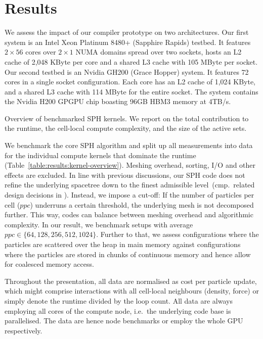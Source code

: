 \section{Results}
\label{section:results}

We assess the impact of our compiler prototype on two architectures.
Our first system is an Intel Xeon Platinum 8480+ (Sapphire Rapids) testbed. 
It features $2 \times 56$ cores over $2 \times 1$ NUMA domains spread over
two sockets, hosts
an L2 cache of 2,048 KByte per core and a shared L3 cache with 105 MByte per
socket.
Our second testbed is an Nvidia GH200 (Grace Hopper) system.
It features 72 cores in a single socket configuration.
Each core has an L2 cache of 1,024 KByte, and a shared L3 cache with 114 MByte for the entire
socket. The system contains the Nvidia H200 GPGPU chip boasting 96GB HBM3 memory at 4TB/s.

\begin{table}[htb]
  \caption{
    Overview of benchmarked SPH kernels. We report on the total contribution to the runtime, the cell-local compute complexity, and the size of the active sets.
    \label{table:results:kernel-overview}
  }
  \begin{center}
    
  \end{center}
\end{table}


We benchmark the core SPH algorithm and split up all measurements into data for the individual compute kernels that dominate the runtime (Table~\ref{table:results:kernel-overview}).
Meshing overhead, sorting, I/O and other effects are excluded.
In line with previous discussions, our SPH code does not refine the underlying spacetree down to the finest admissible level~(cmp.~related design decisions in \cite{Schaller:2024:Swift}).
Instead, we impose a cut-off:
If the number of particles per cell ($ppc$) underruns a certain threshold, the underlying mesh is not decomposed further.
This way, codes can balance between meshing overhead and algorithmic complexity.
In our result, we benchmark setups with average $ppc \in \{64,128,256,512,1024\}$.
Further to that, we assess configurations where the particles are scattered over the heap in main memory against configurations where the particles are stored in chunks of continuous memory and hence allow for coalesced memory access. 



Throughout the presentation, all data are normalised as cost per particle update, which might comprise interactions with all cell-local neighbours (density, force) or simply denote the runtime divided by the loop count.
All data are always employing all cores of the compute node, i.e.~the underlying code base is parallelised.
The data are hence node benchmarks or employ the whole GPU respectively.







